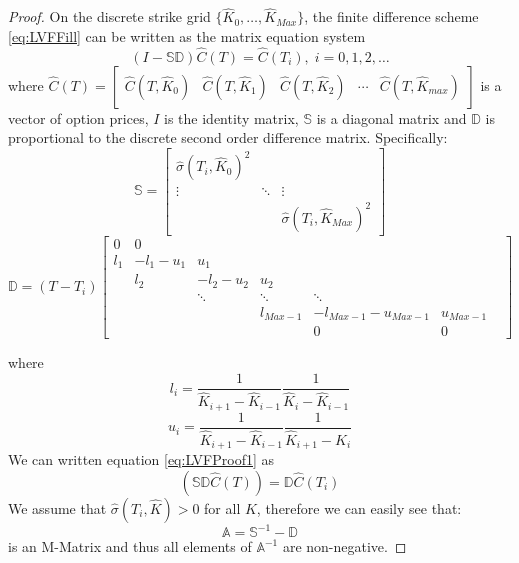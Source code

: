 \documentclass[letterpaper,12pt,titlepage,oneside,final]{book}
\numberwithin{equation}{section}
\theoremstyle{definition}
\begin{document}
\begin{proof}
	On the discrete strike grid $\{\widehat{K}_0,\dots, \widehat{K}_{Max}\}$, the finite difference scheme \eqref{eq:LVFFill} can be written as the matrix equation system 
	\begin{equation}
		(I-\mathcal{\mathbb{S}} \mathcal{\mathbb{D}})\widehat{C}(T)=\widehat{C}(T_i),\; i=0,1,2,\dots
		\label{eq:LVFProof1}
	\end{equation}
	where $\widehat{C}(T)=\begin{bmatrix}
		\widehat{C}(T,\widehat{K}_0)&
		\widehat{C}(T,\widehat{K}_1)&
		\widehat{C}(T,\widehat{K}_2)&
		\cdots&
		\widehat{C}(T,\widehat{K}_{max})
		\end{bmatrix}$ is a vector of option prices, $I$ is the identity matrix, $\mathcal{\mathbb{S}}$ is a diagonal matrix and $\mathcal{\mathbb{D}}$ is proportional to the discrete second order difference matrix. Specifically:
		\begin{equation}
			\mathcal{\mathbb{S}}=	\begin{bmatrix}
				\widehat{\sigma}(T_i,\widehat{K}_{0})^2&&\\
				\vdots&\ddots&\vdots\\
				&&\widehat{\sigma}(T_i,\widehat{K}_{Max})^2
		\end{bmatrix}
		\label{eq:LVFMatrixS}
		\end{equation}
		\begin{equation}
			\mathcal{\mathbb{D}}=	(T-T_i)\begin{bmatrix}
		0&0&&&&\\
		l_1&-l_1-u_1&u_1&&&\\
		&l_2&-l_2-u_2&u_2&&&\\
		&&\ddots&\ddots&\ddots&&\\
		&&&l_{Max-1}&-l_{Max-1}-u_{Max-1}&u_{Max-1}\\
		&&&&0&0
		\end{bmatrix}
		\label{eq:LVFMatrixD}
		\end{equation}

		where 
		\[l_i=\frac{1}{\widehat{K}_{i+1}-\widehat{K}_{i-1}}\frac{1}{\widehat{K}_{i}-\widehat{K}_{i-1}}\]
		\[u_i=\frac{1}{\widehat{K}_{i+1}-\widehat{K}_{i-1}}\frac{1}{\widehat{K}_{i+1}-\widehat{K}_{i}}\]
		We can written equation \eqref{eq:LVFProof1}  as
		\begin{equation}
		[\mathcal{\mathbb{S}}^{-1}-\mathcal{\mathbb{D}}](\mathcal{\mathbb{S}}\mathcal{\mathbb{D}} \widehat{C}(T))=\mathcal{\mathbb{D}} \widehat{C}(T_i)
		\label{eq:LVFProof2}
		\end{equation}
		We assume that $\widehat{\sigma}(T_i,\widehat{K})>0$ for  all $K$, therefore we can easily see that:
		\[\mathcal{\mathbb{A}}=\mathcal{\mathbb{S}}^{-1}-\mathcal{\mathbb{D}}\]
		is an M-Matrix \cite{plemmons1977m} and thus all elements of $\mathcal{\mathbb{A}}^{-1}$ are non-negative.


\end{proof}
\end{document}
